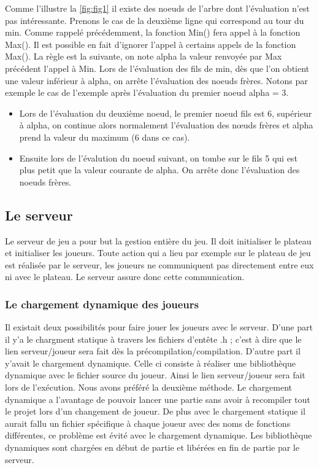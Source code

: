 \documentclass[12pt]{article}
\begin{document}
Comme l'illustre la \ref{fig:fig1} il existe des noeuds de l'arbre dont l'évaluation n'est pas intéressante. Prenons le cas de la deuxième ligne qui correspond au tour du min. Comme rappelé précédemment, la fonction Min() fera appel à la fonction Max(). Il est possible en fait d'ignorer l'appel à certains appels de la fonction Max(). La règle est la suivante, on note alpha la valeur renvoyée par Max précédent l'appel à Min. Lors de l'évaluation des fils de min, dès que l'on obtient une valeur inférieur à alpha, on arrête l'évaluation des noeuds frères. Notons par exemple le cas de l'exemple après l'évaluation du premier noeud \newline alpha = 3.
\begin{itemize}
    \item Lors de l'évaluation du deuxième noeud, le premier noeud fils est 6, supérieur à alpha, on continue alors normalement l'évaluation des n\oe uds frères et alpha prend la valeur du maximum (6 dans ce cas).
    \item Ensuite lors de l'évalution du noeud suivant, on tombe sur le fils 5 qui est plus petit que la valeur courante de alpha. On arrête donc l'évaluation des noeuds frères.

\end{itemize}


\subsection{Le serveur}

Le serveur de jeu a pour but la gestion entière du jeu. Il doit initialiser le plateau et initialiser les joueurs. Toute action qui a lieu par exemple sur le plateau de jeu est réalisée par le serveur, les joueurs ne communiquent pas directement entre eux ni avec le plateau. Le serveur assure donc cette communication.

\subsubsection{Le chargement dynamique des joueurs}

Il existait deux possibilités pour faire jouer les joueurs avec le serveur.\newline
D'une part il y'a le chargment statique à travers les fichiers d'entête .h ; c'est à dire que le lien serveur/joueur sera fait dès la précompilation/compilation. D'autre part il y'avait le chargement dynamique. Celle ci consiste à réaliser une bibliothèque dynamique avec le fichier source du joueur. Ainsi le lien serveur/joueur sera fait lors de l'exécution. Nous avons préféré la deuxième méthode. Le chargement dynamique a l'avantage de pouvoir lancer une partie sans avoir à recompiler tout le projet lors d'un changement de joueur. De plus avec le chargement statique il aurait fallu un fichier spécifique à chaque joueur avec des noms de fonctions différentes, ce problème est évité avec le chargement dynamique. \newline Les bibliothèque dynamiques sont chargées en début de partie et libérées en fin de partie par le serveur.
\end{document}
